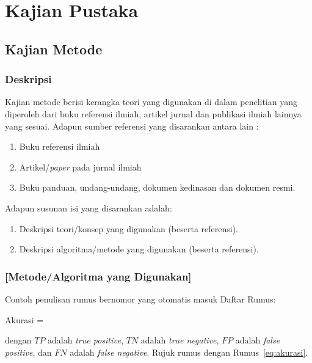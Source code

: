 \chapter{Kajian Pustaka}
\label{bab:kajian}

\section{Kajian Metode}
\label{sec:kajianmetode}

\subsection{Deskripsi}
Kajian metode berisi kerangka teori yang digunakan di dalam penelitian yang diperoleh dari buku referensi ilmiah, artikel jurnal dan publikasi ilmiah lainnya yang sesuai. Adapun sumber referensi yang disarankan antara lain \parencite{pressman2020software}:
\begin{enumerate}
  \item Buku referensi ilmiah
  \item Artikel/\textit{paper} pada jurnal ilmiah
  \item Buku panduan, undang-undang, dokumen kedinasan dan dokumen resmi.
\end{enumerate}

Adapun susunan isi yang disarankan adalah:
\begin{enumerate}
  \item Deskripsi teori/konsep yang digunakan (beserta referensi).
  \item Deskripsi algoritma/metode yang digunakan (beserta referensi).
\end{enumerate}

\subsection{[Metode/Algoritma yang Digunakan]}

Contoh penulisan rumus bernomor yang otomatis masuk Daftar Rumus:
\begin{rumus}{Akurasi}
   = 
  \label{eq:akurasi}
\end{rumus}
dengan $TP$ adalah \textit{true positive}, $TN$ adalah \textit{true negative}, $FP$ adalah \textit{false positive}, dan $FN$ adalah \textit{false negative}. Rujuk rumus dengan Rumus~\eqref{eq:akurasi}.

